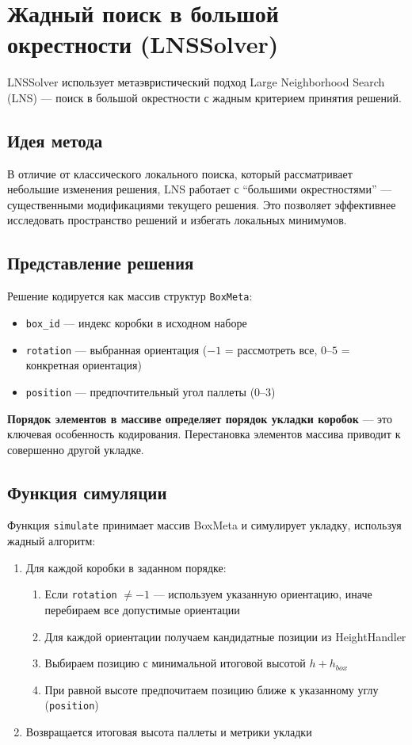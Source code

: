 \section{Жадный поиск в большой окрестности (LNSSolver)}

LNSSolver использует метаэвристический подход Large Neighborhood Search (LNS) --- поиск в большой окрестности с жадным критерием принятия решений.

\subsection{Идея метода}

В отличие от классического локального поиска, который рассматривает небольшие изменения решения, LNS работает с ``большими окрестностями'' --- существенными модификациями текущего решения. Это позволяет эффективнее исследовать пространство решений и избегать локальных минимумов.

\subsection{Представление решения}

Решение кодируется как массив структур \texttt{BoxMeta}:
\begin{itemize}
    \item \texttt{box\_id} --- индекс коробки в исходном наборе
    \item \texttt{rotation} --- выбранная ориентация ($-1$ = рассмотреть все, $0$--$5$ = конкретная ориентация)
    \item \texttt{position} --- предпочтительный угол паллеты ($0$--$3$)
\end{itemize}

\textbf{Порядок элементов в массиве определяет порядок укладки коробок} --- это ключевая особенность кодирования. Перестановка элементов массива приводит к совершенно другой укладке.

\subsection{Функция симуляции}

Функция \texttt{simulate} принимает массив BoxMeta и симулирует укладку, используя жадный алгоритм:
\begin{enumerate}
    \item Для каждой коробки в заданном порядке:
    \begin{enumerate}
        \item Если \texttt{rotation} $\neq -1$ --- используем указанную ориентацию, иначе перебираем все допустимые ориентации
        \item Для каждой ориентации получаем кандидатные позиции из HeightHandler
        \item Выбираем позицию с минимальной итоговой высотой $h + h_{box}$
        \item При равной высоте предпочитаем позицию ближе к указанному углу (\texttt{position})
    \end{enumerate}
    \item Возвращается итоговая высота паллеты и метрики укладки
\end{enumerate}

